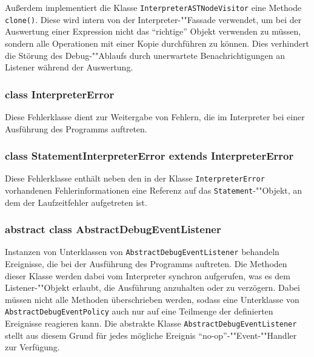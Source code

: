 Außerdem implementiert die Klasse \texttt{InterpreterASTNodeVisitor} eine Methode \texttt{clone()}. Diese wird intern von der Interpreter-""Fassade verwendet, um bei der Auswertung einer Expression nicht das ``richtige'' Objekt verwenden zu müssen, sondern alle Operationen mit einer Kopie durchführen zu können. Dies verhindert die Störung des Debug-""Ablaufs durch unerwartete Benachrichtigungen an Listener während der Auswertung.

\subsubsection{class InterpreterError}
Diese Fehlerklasse dient zur Weitergabe von Fehlern, die im Interpreter bei einer Ausführung des Programms auftreten.

\subsubsection{class StatementInterpreterError extends InterpreterError}
Diese Fehlerklasse enthält neben den in der Klasse \texttt{InterpreterError} vorhandenen Fehlerinformationen eine Referenz auf das \texttt{Statement}-""Objekt, an dem der Laufzeitfehler aufgetreten ist.

\subsubsection{abstract class AbstractDebugEventListener}
Instanzen von Unterklassen von \texttt{AbstractDebugEventListener} behandeln Ereignisse, die bei der Ausführung des Programms auftreten. Die Methoden dieser Klasse werden dabei vom Interpreter synchron aufgerufen, was es dem Listener-""Objekt erlaubt, die Ausführung anzuhalten oder zu verzögern. Dabei müssen nicht alle Methoden überschrieben werden, sodass eine Unterklasse von \texttt{AbstractDebugEventPolicy} auch nur auf eine Teilmenge der definierten Ereignisse reagieren kann. Die abstrakte Klasse \texttt{AbstractDebugEventListener} stellt aus diesem Grund für jedes mögliche Ereignis ``no-op''-""Event-""Handler zur Verfügung.

